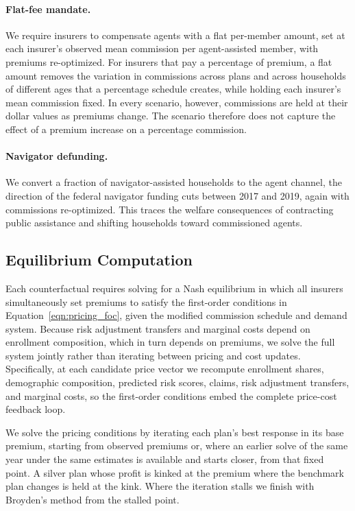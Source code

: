 \documentclass[12pt]{article}
\begin{document}
\paragraph{Flat-fee mandate.} We require insurers to compensate agents with a flat per-member amount, set at each insurer's observed mean commission per agent-assisted member, with premiums re-optimized. For insurers that pay a percentage of premium, a flat amount removes the variation in commissions across plans and across households of different ages that a percentage schedule creates, while holding each insurer's mean commission fixed. In every scenario, however, commissions are held at their dollar values as premiums change. The scenario therefore does not capture the effect of a premium increase on a percentage commission.

\paragraph{Navigator defunding.} We convert a fraction of navigator-assisted households to the agent channel, the direction of the federal navigator funding cuts between 2017 and 2019, again with commissions re-optimized. This traces the welfare consequences of contracting public assistance and shifting households toward commissioned agents.

\subsection{Equilibrium Computation}
\label{subsec:cf_computation}

Each counterfactual requires solving for a Nash equilibrium in which all insurers simultaneously set premiums to satisfy the first-order conditions in Equation~\eqref{eqn:pricing_foc}, given the modified commission schedule and demand system. Because risk adjustment transfers and marginal costs depend on enrollment composition, which in turn depends on premiums, we solve the full system jointly rather than iterating between pricing and cost updates. Specifically, at each candidate price vector we recompute enrollment shares, demographic composition, predicted risk scores, claims, risk adjustment transfers, and marginal costs, so the first-order conditions embed the complete price-cost feedback loop.

We solve the pricing conditions by iterating each plan's best response in its base premium, starting from observed premiums or, where an earlier solve of the same year under the same estimates is available and starts closer, from that fixed point. A silver plan whose profit is kinked at the premium where the benchmark plan changes is held at the kink. Where the iteration stalls we finish with Broyden's method from the stalled point.
\end{document}
